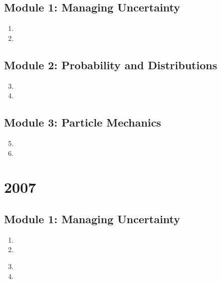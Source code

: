 \documentclass[fleqn,titlepage]{book}
\numberwithin{equation}{section}
\theoremstyle{plain}
\theoremstyle{definition}
\theoremstyle{remark}
\begin{document}
\section{Module 1: Managing Uncertainty}
\begin{enumerate}[label=\bfseries  \arabic*.]\setcounter{enumi}{0}
\item 
\item 
\end{enumerate}
\section{Module 2: Probability and Distributions}
\begin{enumerate}[label=\bfseries  \arabic*.]\setcounter{enumi}{2}
\item 
\item 
\end{enumerate}
\section{Module 3: Particle Mechanics}
\begin{enumerate}[label=\bfseries  \arabic*.]\setcounter{enumi}{4}
\item 
\item 
\end{enumerate}

\chapter{2007}
\section{Module 1: Managing Uncertainty}
\begin{enumerate}[label=\bfseries  \arabic*.]\setcounter{enumi}{0}
\item 
\item 
\end{enumerate}
\begin{enumerate}[label=\bfseries  \arabic*.]\setcounter{enumi}{2}
\section{Module 2: Probability and Distributions}
\item 
\item 
\end{enumerate}
\end{document}
